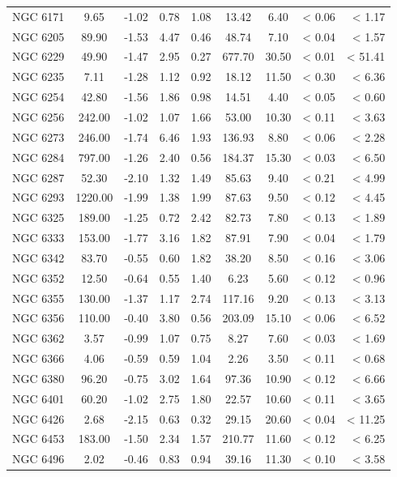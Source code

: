\documentclass[doublespace,nopageskip]{VTthesis}
\begin{document}
\begin{appendices}
\begin{center}
\begin{longtable}{lcccccccr}
NGC 6171 & 9.65 & -1.02 & 0.78 & 1.08 & 13.42 & 6.40 & < 0.06 & < 1.17\\
NGC 6205 & 89.90 & -1.53 & 4.47 & 0.46 & 48.74 & 7.10 & < 0.04 & < 1.57\\
NGC 6229 & 49.90 & -1.47 & 2.95 & 0.27 & 677.70 & 30.50 & < 0.01 & < 51.41\\
NGC 6235 & 7.11 & -1.28 & 1.12 & 0.92 & 18.12 & 11.50 & < 0.30 & < 6.36\\
NGC 6254 & 42.80 & -1.56 & 1.86 & 0.98 & 14.51 & 4.40 & < 0.05 & < 0.60\\
NGC 6256 & 242.00 & -1.02 & 1.07 & 1.66 & 53.00 & 10.30 & < 0.11 & < 3.63\\
NGC 6273 & 246.00 & -1.74 & 6.46 & 1.93 & 136.93 & 8.80 & < 0.06 & < 2.28\\
NGC 6284 & 797.00 & -1.26 & 2.40 & 0.56 & 184.37 & 15.30 & < 0.03 & < 6.50\\
NGC 6287 & 52.30 & -2.10 & 1.32 & 1.49 & 85.63 & 9.40 & < 0.21 & < 4.99\\
NGC 6293 & 1220.00 & -1.99 & 1.38 & 1.99 & 87.63 & 9.50 & < 0.12 & < 4.45\\
NGC 6325 & 189.00 & -1.25 & 0.72 & 2.42 & 82.73 & 7.80 & < 0.13 & < 1.89\\
NGC 6333 & 153.00 & -1.77 & 3.16 & 1.82 & 87.91 & 7.90 & < 0.04 & < 1.79\\
NGC 6342 & 83.70 & -0.55 & 0.60 & 1.82 & 38.20 & 8.50 & < 0.16 & < 3.06\\
NGC 6352 & 12.50 & -0.64 & 0.55 & 1.40 & 6.23 & 5.60 & < 0.12 & < 0.96\\
NGC 6355 & 130.00 & -1.37 & 1.17 & 2.74 & 117.16 & 9.20 & < 0.13 & < 3.13\\
NGC 6356 & 110.00 & -0.40 & 3.80 & 0.56 & 203.09 & 15.10 & < 0.06 & < 6.52\\
NGC 6362 & 3.57 & -0.99 & 1.07 & 0.75 & 8.27 & 7.60 & < 0.03 & < 1.69\\
NGC 6366 & 4.06 & -0.59 & 0.59 & 1.04 & 2.26 & 3.50 & < 0.11 & < 0.68\\
NGC 6380 & 96.20 & -0.75 & 3.02 & 1.64 & 97.36 & 10.90 & < 0.12 & < 6.66\\
NGC 6401 & 60.20 & -1.02 & 2.75 & 1.80 & 22.57 & 10.60 & < 0.11 & < 3.65\\
NGC 6426 & 2.68 & -2.15 & 0.63 & 0.32 & 29.15 & 20.60 & < 0.04 & < 11.25\\
NGC 6453 & 183.00 & -1.50 & 2.34 & 1.57 & 210.77 & 11.60 & < 0.12 & < 6.25\\
NGC 6496 & 2.02 & -0.46 & 0.83 & 0.94 & 39.16 & 11.30 & < 0.10 & < 3.58\\

\end{longtable}
\end{center}
\end{appendices}
\end{document}
